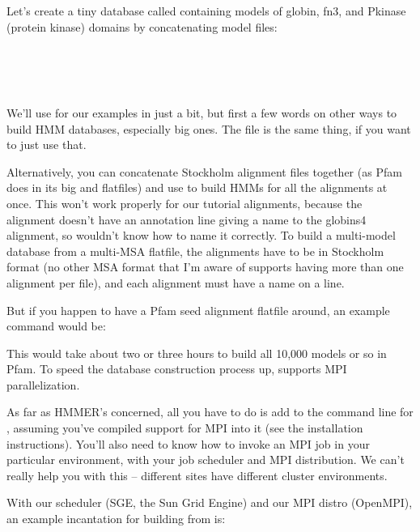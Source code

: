 Let's create a tiny database called  containing models
of globin, fn3, and Pkinase (protein kinase) domains by concatenating
model files:

\\
\\
\\

We'll use  for our examples in just a bit, but first a
few words on other ways to build HMM databases, especially big ones.
The file  is the same thing, if you want to
just use that.

Alternatively, you can concatenate Stockholm alignment files together
(as Pfam does in its big  and 
flatfiles) and use  to build HMMs for all the
alignments at once. This won't work properly for our tutorial
alignments, because the  alignment doesn't have an
 annotation line giving a name to the globins4
alignment, so  wouldn't know how to name it
correctly. To build a multi-model database from a multi-MSA flatfile,
the alignments have to be in Stockholm format (no other MSA format
that I'm aware of supports having more than one alignment per file),
and each alignment must have a name on a  line.

But if you happen to have a Pfam seed alignment flatfile
 around, an example command would be:


This would take about two or three hours to build all 10,000 models or
so in Pfam.  To speed the database construction process up,
 supports MPI parallelization. 

As far as HMMER's concerned, all you have to do is add  to
the command line for , assuming you've compiled support
for MPI into it (see the installation instructions).  You'll also need
to know how to invoke an MPI job in your particular environment, with
your job scheduler and MPI distribution. We can't really help you with
this -- different sites have different cluster environments.

With our scheduler (SGE, the Sun Grid Engine) and our MPI distro
(OpenMPI), an example incantation for building  from
 is:

